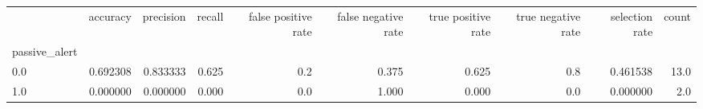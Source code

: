 \begin{tabular}{lrrrrrrrrr}
\toprule
{} &  accuracy &  precision &  recall &  false positive rate &  false negative rate &  true positive rate &  true negative rate &  selection rate &  count \\
passive\_alert &           &            &         &                      &                      &                     &                     &                 &        \\
\midrule
0.0           &  0.692308 &   0.833333 &   0.625 &                  0.2 &                0.375 &               0.625 &                 0.8 &        0.461538 &   13.0 \\
1.0           &  0.000000 &   0.000000 &   0.000 &                  0.0 &                1.000 &               0.000 &                 0.0 &        0.000000 &    2.0 \\
\bottomrule
\end{tabular}
